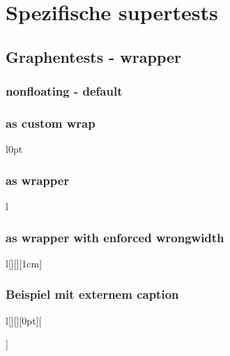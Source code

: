 \documentclass[Typ=Mitschrieb,Vorlesung=LAII]{Lilly}
\begin{document}
\chapter{Spezifische supertests}

\section{Graphentests - wrapper }
\subsection{nonfloating - default}
    \begin{graph}
        \plotline{\x*\x}
    \end{graph}\lipsum[6-8]

\subsection{as custom wrap}
\begin{wrapfigure}{l}{0pt}
    \begin{graph}
        \plotline{\x*\x}
    \end{graph}
\end{wrapfigure}\lipsum[6-8]

\subsection{as wrapper}

        \begin{wgraph}{l}
            \plotline[purple]{\x*\x}
        \end{wgraph}\lipsum[6-8]

\subsection{as wrapper with enforced wrongwidth}
        \begin{wgraph}{l}[][][1cm]
            \plotline[Ao]{\x*\x}
        \end{wgraph}\lipsum[6-8]

\subsection{Beispiel mit externem caption}
        \begin{wgraph}{l}[][][0pt][\caption{Wichtiger Graph}]
            \plotline[Azure]{\x*\x}
        \end{wgraph}\lipsum[6-8]
\end{document}
